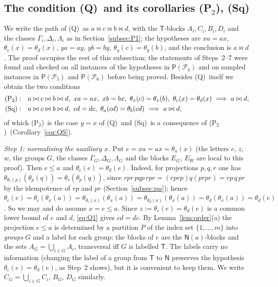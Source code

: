 \documentclass[11pt]{amsart}
\theoremstyle{definition}
\renewcommand{\P}{\mathcal{P}}      %
\newcommand{\PA}{\mathsf{P}}         %
\newcommand{\T}{\mathsf{T}}
\newcommand{\N}{\mathsf{N}}
\newcommand{\mt}{\bowtie}      %
\newcommand{\Wire}{\textup{(Sq)}}      %
\newcommand{\Ptwo}{\textup{(P$_2$)}}
\newcommand{\Qcond}{\textup{(Q)}}
\begin{document}
\subsection{The condition \Qcond\ and its corollaries \Ptwo, \Wire}\label{subsec:Q}

We write the path of \Qcond\ as $a\mt c\mt b\mt d$, with the $\T$-blocks $A_i,C_i,B_i,D_i$ and the classes $\Gamma_i,\Delta_i,\Lambda_i$ as in Section~\ref{subsec:P1}; the hypotheses are $xa=ax$, $\theta_c(x)=\theta_d(x)$, $ya=ay$, $yb=by$, $\theta_y(c)=\theta_y(b)$, and the conclusion is $a\mt d$. The proof occupies the rest of this subsection; the statements of Steps~2--7 were found and checked on all instances of the hypotheses in $\PA(\P_4)$ and on sampled instances in $\PA(\P_5)$ and $\PA(\P_6)$ before being proved. Besides \Qcond\ itself we obtain the two conditions
\begin{align*}
\Ptwo:\quad& a\mt c\mt b\mt d,\ xa=ax,\ xb=bx,\ \theta_x(c)=\theta_x(b),\ \theta_c(x)=\theta_d(x)\ \Longrightarrow\ a\mt d,\\
\Wire:\quad& a\mt c\mt b\mt d,\ cd=dc,\ \theta_a(cd)=\theta_b(cd)\ \Longrightarrow\ a\mt d,
\end{align*}
of which \Ptwo\ is the case $y=x$ of \Qcond\ and \Wire\ is a consequence of \Ptwo\ (Corollary~\ref{cor:QS}).

\smallskip
\emph{Step 1: normalising the auxiliary $x$.} Put $e=xa=ax=\theta_a(x)$ (the letters $e$, $z$, $w$, the groups $G$, the classes $\Gamma_G,\Delta_G,\Lambda_G$ and the blocks $E_G$, $E_W$ are local to this proof). Then $e\le a$ and $\theta_c(e)=\theta_d(e)$. Indeed, for projections $p,q,r$ one has $\theta_{\theta_r(p)}(\theta_p(q))=\theta_r(\theta_p(q))$, since $rpr\,pqp\,rpr=(rprp)q(prpr)=rp\,q\,pr$ by the idempotence of $rp$ and $pr$ (Section~\ref{subsec:rss}); hence $\theta_c(e)=\theta_c(\theta_x(a))=\theta_{\theta_c(x)}(\theta_x(a))=\theta_{\theta_d(x)}(\theta_x(a))=\theta_d(\theta_x(a))=\theta_d(e)$. So we may and do assume $x=e\le a$. Since $z:=\theta_c(e)=\theta_d(e)$ is a common lower bound of $c$ and $d$, \eqref{eq:Q1} gives $cd=dc$. By Lemma~\ref{lem:order}(a) the projection $e\le a$ is determined by a partition $P$ of the index set $\{1,\dots,m\}$ into \emph{groups} $G$ and a label for each group: the blocks of $e$ are the $\N(a)$-blocks and the sets $A_G=\bigcup_{i\in G}A_i$, transversal iff $G$ is labelled $\T$. The labels carry no information (changing the label of a group from $\T$ to $\N$ preserves the hypothesis $\theta_c(e)=\theta_d(e)$, as Step~2 shows), but it is convenient to keep them. We write $C_G=\bigcup_{i\in G}C_i$, $B_G$, $D_G$ similarly.
\end{document}
